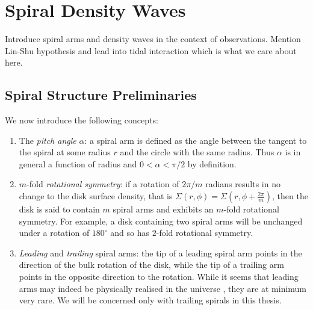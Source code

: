 \section{Spiral Density Waves}

Introduce spiral arms and density waves in the context of observations. Mention Lin-Shu hypothesis and lead into tidal interaction which is what we care about here.

\subsection{Spiral Structure Preliminaries}
We now introduce the following concepts:
\begin{enumerate}
    \item The \textit{pitch angle} $\alpha$: a spiral arm is defined as the angle between the tangent to the spiral at some radius $r$ and the circle with the same radius. 
    Thus $\alpha$ is in general a function of radius and $0 < \alpha < \pi/2$ by definition.
    \item $m$-fold \textit{rotational symmetry}: if a rotation of $2\pi/m$ radians results in no change to the disk surface density, that is $\Sigma(r,\phi)=\Sigma(r,\phi+\frac{2\pi}{m})$, then the disk is said to contain $m$ spiral arms and exhibits an $m$-fold rotational symmetry. 
    For example, a disk containing two spiral arms will be unchanged under a rotation of $180^\circ$ and so has $2$-fold rotational symmetry.
    \item \textit{Leading} and \textit{trailing} spiral arms: the tip of a leading spiral arm points in the direction of the bulk rotation of the disk, while the tip of a trailing arm points in the opposite direction to the rotation. 
    While it seems that leading arms may indeed be physically realised in the universe \citep[eg.][]{vaisanen2008}, they are at minimum very rare. 
    We will be concerned only with trailing spirals in this thesis.
\end{enumerate}

